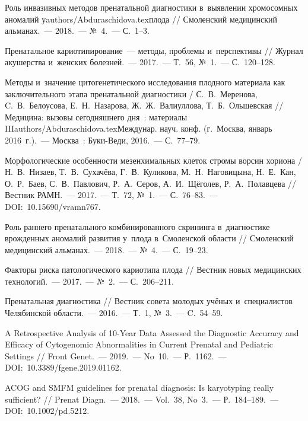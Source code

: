 \begin{thebibliography}{99}
\bibitem{} Роль инвазивных методов пренатальной диагностики в~выявлении хромосомных аномалий уauthors/Abduraschidova.texплода // Смоленский медицинский альманах.~--- 2018.~--- №~4.~--- С.~1--3.

\bibitem{} Пренатальное кариотипирование~--- методы, проблемы и~перспективы // Журнал акушерства и~женских болезней.~--- 2017.~--- Т.~56, №~1.~--- С.~120--128.

\bibitem{} Методы и~значение цитогенетического исследования плодного материала как заключительного этапа пренатальной диагностики / С.~В.~Меренова, C.~В.~Белоусова,  Е.~Н.~Назарова, Ж.~Ж.~Валиуллова, Т.~Б.~Ольшевская // Медицина: вызовы сегодняшнего дня~: материалы IIIauthors/Abduraschidova.texМеждунар. науч. конф. (г.~Москва, январь 2016~г.).~--- Москва~: Буки-Веди, 2016.~--- С.~77--79.

\bibitem{} Морфологические особенности мезенхимальных клеток стромы ворсин хориона / Н.~В.~Низаев, Т.~В.~Сухачёва, Г.~В.~Куликова, М.~Н.~Наговицына, Н.~Е.~Кан, О.~Р.~Баев, С.~В.~Павлович, Р.~А.~Серов, А.~И.~Щёголев, Р.~А.~Полавцева // Вестник РАМН.~--- 2017.~--- Т.~72, №~1.~--- С.~76--83.~--- DOI:~10.15690/vramn767.

\bibitem{} Роль раннего пренатального комбинированного скрининга в~диагностике врожденных аномалий развития у~плода в~Смоленской области // Смоленский медицинский альманах.~--- 2018.~--- №~4.~--- С.~19--23.

\bibitem{} Факторы риска патологического кариотипа плода // Вестник новых медицинских технологий.~--- 2017.~--- №~2.~--- С.~206--211.

\bibitem{} Пренатальная диагностика // Вестник совета молодых учёных и~специалистов Челябинской области.~--- 2016.~--- Т.~1, №~3.~--- C.~54--59.

\bibitem{} A Retrospective Analysis of 10-Year Data Assessed the Diagnostic Accuracy and Efficacy of Cytogenomic Abnormalities in Current Prenatal and Pediatric Settings //  Front Genet.~--- 2019.~--- No~10.~--- Р.~1162.~--- DOI:~10.3389/fgene.2019.01162.

\bibitem{} ACOG and SMFM guidelines for prenatal diagnosis: Is karyotyping really sufficient? // Prenat Diagn.~--- 2018.~--- Vol.~38, No~3.~--- Р.~184--189.~--- DOI:~10.1002/pd.5212.


\end{thebibliography}
